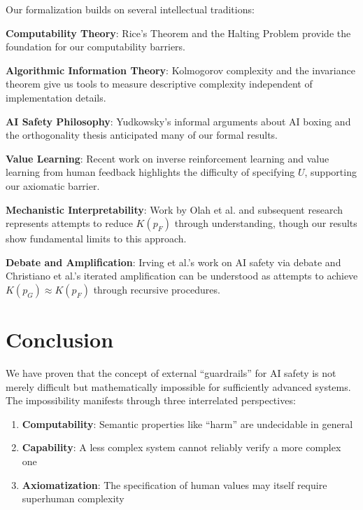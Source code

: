 \documentclass[11pt]{article}
\begin{document}
Our formalization builds on several intellectual traditions:

\textbf{Computability Theory}: Rice's Theorem \cite{rice1953classes} and the Halting Problem \cite{turing1936} provide the foundation for our computability barriers.

\textbf{Algorithmic Information Theory}: Kolmogorov complexity \cite{kolmogorov1965three, chaitin1975theory} and the invariance theorem give us tools to measure descriptive complexity independent of implementation details.

\textbf{AI Safety Philosophy}: Yudkowsky's informal arguments about AI boxing \cite{yudkowsky2002ai} and the orthogonality thesis \cite{bostrom2014superintelligence} anticipated many of our formal results.

\textbf{Value Learning}: Recent work on inverse reinforcement learning \cite{ng2000algorithms, hadfield2016cooperative} and value learning from human feedback \cite{christiano2017deep} highlights the difficulty of specifying $U$, supporting our axiomatic barrier.

\textbf{Mechanistic Interpretability}: Work by Olah et al. \cite{olah2020zoom} and subsequent research \cite{elhage2021mathematical} represents attempts to reduce $K(p_F)$ through understanding, though our results show fundamental limits to this approach.

\textbf{Debate and Amplification}: Irving et al.'s work on AI safety via debate \cite{irving2018debate} and Christiano et al.'s iterated amplification \cite{christiano2018amplification} can be understood as attempts to achieve $K(p_G) \approx K(p_F)$ through recursive procedures.

\section{Conclusion}

We have proven that the concept of external ``guardrails'' for AI safety is not merely difficult but mathematically impossible for sufficiently advanced systems. The impossibility manifests through three interrelated perspectives:

\begin{enumerate}
\item \textbf{Computability}: Semantic properties like ``harm'' are undecidable in general
\item \textbf{Capability}: A less complex system cannot reliably verify a more complex one
\item \textbf{Axiomatization}: The specification of human values may itself require superhuman complexity
\end{enumerate}
\end{document}
